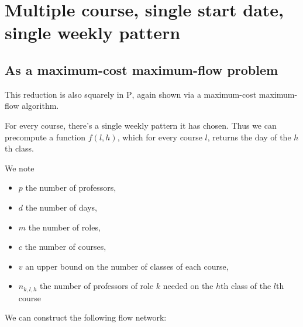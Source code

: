 \section{Multiple course, single start date, single weekly pattern}

\subsection{As a maximum-cost maximum-flow problem}
This reduction is also squarely in \textsc{P}, again shown via a maximum-cost maximum-flow algorithm.

For every course, there's a single weekly pattern it has chosen. Thus we can precompute a function $f(l, h)$, which for every course $l$, returns the day of the $h$th class.

We note
\begin{itemize}
  \item $p$ the number of professors,
  \item $d$ the number of days,
  \item $m$ the number of roles,
  \item $c$ the number of courses,
  \item $v$ an upper bound on the number of classes of each course,
  \item $n_{k, l, h}$ the number of professors of role $k$ needed on the $h$th class of the $l$th course
\end{itemize}

We can construct the following flow network:

